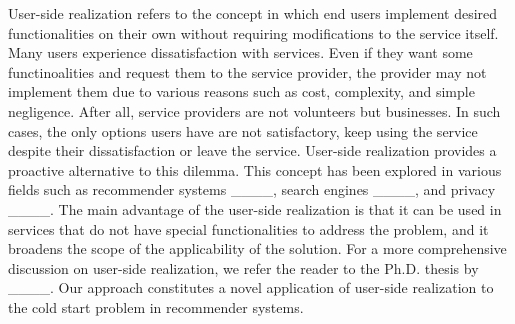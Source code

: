 User-side realization refers to the concept in which end users implement desired functionalities on their own without requiring modifications to the service itself. Many users experience dissatisfaction with services. Even if they want some functinoalities and request them to the service provider, the provider may not implement them due to various reasons such as cost, complexity, and simple negligence. After all, service providers are not volunteers but businesses. In such cases, the only options users have are not satisfactory, keep using the service despite their dissatisfaction or leave the service. User-side realization provides a proactive alternative to this dilemma. This concept has been explored in various fields such as recommender systems ____, search engines ____, and privacy ____. The main advantage of the user-side realization is that it can be used in services that do not have special functionalities to address the problem, and it broadens the scope of the applicability of the solution. For a more comprehensive discussion on user-side realization, we refer the reader to the Ph.D. thesis by ____. Our approach constitutes a novel application of user-side realization to the cold start problem in recommender systems.